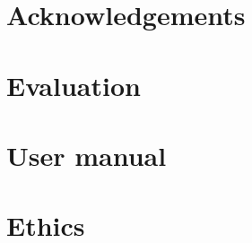 \documentclass[12pt]{report}
\begin{document}
    \chapter*{Acknowledgements}
    
    
    
    
    
    \appendix
    
    \chapter{Evaluation}\label{app:evaln}
    
    
    \chapter{User manual}\label{app:man}
    
    
    \chapter{Ethics}
    
\end{document}
